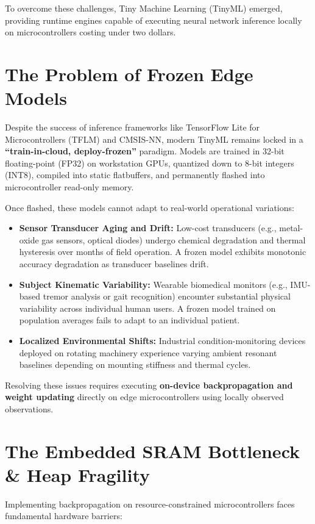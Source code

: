 \documentclass[12pt,a4paper]{report}
\begin{document}
To overcome these challenges, Tiny Machine Learning (TinyML) emerged, providing runtime engines capable of executing neural network inference locally on microcontrollers costing under two dollars.

\section{The Problem of Frozen Edge Models}
Despite the success of inference frameworks like TensorFlow Lite for Microcontrollers (TFLM) and CMSIS-NN, modern TinyML remains locked in a \textbf{``train-in-cloud, deploy-frozen''} paradigm. Models are trained in 32-bit floating-point (FP32) on workstation GPUs, quantized down to 8-bit integers (INT8), compiled into static flatbuffers, and permanently flashed into microcontroller read-only memory.

Once flashed, these models cannot adapt to real-world operational variations:
\begin{itemize}
    \item \textbf{Sensor Transducer Aging and Drift:} Low-cost transducers (e.g., metal-oxide gas sensors, optical diodes) undergo chemical degradation and thermal hysteresis over months of field operation. A frozen model exhibits monotonic accuracy degradation as transducer baselines drift.
    \item \textbf{Subject Kinematic Variability:} Wearable biomedical monitors (e.g., IMU-based tremor analysis or gait recognition) encounter substantial physical variability across individual human users. A frozen model trained on population averages fails to adapt to an individual patient.
    \item \textbf{Localized Environmental Shifts:} Industrial condition-monitoring devices deployed on rotating machinery experience varying ambient resonant baselines depending on mounting stiffness and thermal cycles.
\end{itemize}

Resolving these issues requires executing \textbf{on-device backpropagation and weight updating} directly on edge microcontrollers using locally observed observations.

\section{The Embedded SRAM Bottleneck \& Heap Fragility}
Implementing backpropagation on resource-constrained microcontrollers faces fundamental hardware barriers:
\end{document}

